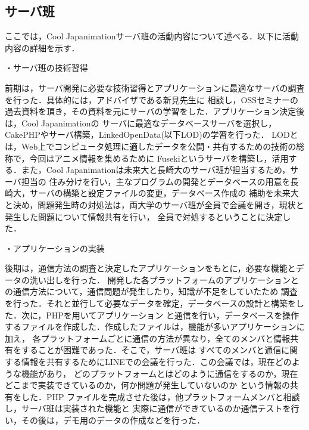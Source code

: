 \subsection{サーバ班}
\par
ここでは，Cool Japanimationサーバ班の活動内容について述べる．以下に活動内容の詳細を示す．
\par
・サーバ班の技術習得
\par
前期は，サーバ開発に必要な技術習得とアプリケーションに最適なサーバの調査を行った．具体的には，アドバイザである新見先生に
相談し，OSSセミナーの過去資料を頂き，その資料を元にサーバの学習をした．アプリケーション決定後は，Cool Japanimationの
サーバに最適なデータベースサーバを選択し，CakePHPやサーバ構築，LinkedOpenData(以下LOD)の学習を行った．
LODとは，Web上でコンピュータ処理に適したデータを公開・共有するための技術の総称で，今回はアニメ情報を集めるために
Fusekiというサーバを構築し，活用する．また，Cool Japanimationは未来大と長崎大のサーバ班が担当するため，サーバ担当の
住み分けを行い，主なプログラムの開発とデータベースの用意を長崎大，サーバの構築と設定ファイルの変更，データベース作成の
補助を未来大と決め，問題発生時の対処法は，両大学のサーバ班が全員で会議を開き，現状と発生した問題について情報共有を行い，
全員で対処するということに決定した．
\par
・アプリケーションの実装
\par
後期は，通信方法の調査と決定したアプリケーションをもとに，必要な機能とデータの洗い出しを行った．
開発した各プラットフォームのアプリケーションとの通信方法について，通信問題が発生したり，知識が不足をしていたため
調査を行った．それと並行して必要なデータを確定，データベースの設計と構築をした．次に，PHPを用いてアプリケーション
と通信を行い，データベースを操作するファイルを作成した．作成したファイルは，機能が多いアプリケーションに加え，
各プラットフォームごとに通信の方法が異なり，全てのメンバと情報共有をすることが困難であった．そこで，サーバ班は
すべてのメンバと通信に関する情報を共有するためにLINEでの会議を行った．この会議では，現在どのような機能があり，
どのプラットフォームとはどのように通信をするのか，現在どこまで実装できているのか，何か問題が発生していないのか
という情報の共有をした．PHP ファイルを完成させた後は，他プラットフォームメンバと相談し，サーバ班は実装された機能と
実際に通信ができているのか通信テストを行い，その後は，デモ用のデータの作成などを行った．



